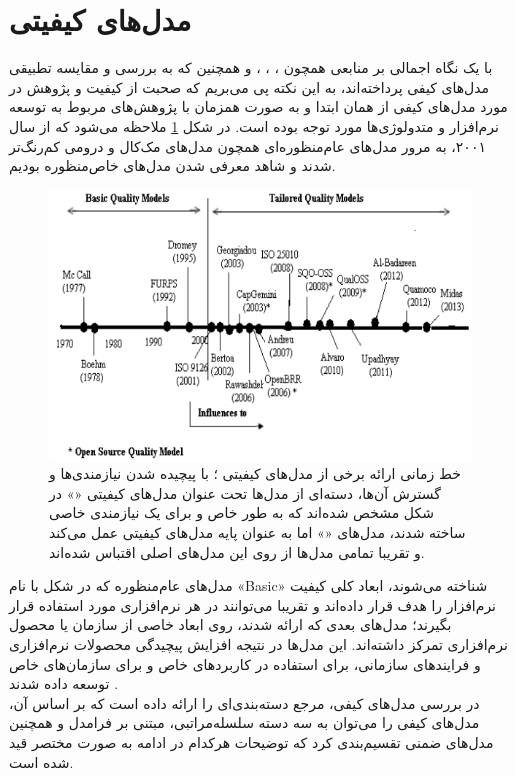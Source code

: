 \section{مدل‌های کیفیتی}
با یک نگاه اجمالی بر منابعی همچون
\cite{wagner_software_2013}،
\cite{seffah_usability_2006}، 
\cite{pressman_software_2015}،
\cite{p._miguel_review_2014}
و همچنین
\cite{sommerville_software_2016}
که به بررسی و مقایسه تطبیقی مدل‌های کیفی پرداخته‌اند، به این نکته پی می‌بریم که صحبت از کیفیت و پژوهش در مورد مدل‌های کیفی از همان ابتدا و به صورت همزمان با پژوهش‌های مربوط به توسعه نرم‌افزار و متدولوژی‌ها مورد توجه بوده است.
در شکل
\ref{fig:qmodels}
ملاحظه می‌شود که از سال ۲۰۰۱، به مرور مدل‌های عام‌منظوره‌ای همچون مدل‌های مک‌کال
و درومی
کم‌رنگ‌تر شدند و شاهد معرفی شدن مدل‌های خاص‌منظوره بودیم.
\begin{figure}[H]
	\centering\includegraphics[width=12cm]{Resources/qmodels.PNG}
	\caption[خط زمانی ارائه برخی از مدل‌های کیفیتی]
	{خط زمانی
		ارائه برخی از مدل‌های کیفیتی
		\cite{p._miguel_review_2014}؛
		با پیچیده شدن نیازمندی‌ها و گسترش آن‌ها، دسته‌ای از مدل‌ها تحت عنوان مدل‌های کیفیتی
		«»
		در شکل مشخص شده‌اند که به طور خاص و برای یک نیازمندی خاصی ساخته شدند، مدل‌های
		«»
		اما به عنوان پایه مدل‌های کیفیتی عمل می‌کند و تقریبا تمامی مدل‌ها از روی این مدل‌های اصلی اقتباس شده‌اند.
	}
	\label{fig:qmodels}
\end{figure}
مدل‌های عام‌منظوره که در شکل با نام «Basic» شناخته می‌شوند، ابعاد کلی کیفیت نرم‌افزار را هدف قرار داده‌اند و تقریبا می‌توانند در هر نرم‌افزاری مورد استفاده قرار بگیرند؛ مدل‌های بعدی که ارائه شدند، روی ابعاد خاصی از سازمان یا محصول نرم‌افزاری تمرکز داشته‌اند. این مدل‌ها در نتیجه افزایش پیچیدگی محصولات نرم‌افزاری و فرایندهای سازمانی، برای استفاده در کاربردهای خاص و برای سازمان‌های خاص توسعه داده شدند
\cite{p._miguel_review_2014}.\\
در بررسی مدل‌های کیفی، مرجع
\cite{wagner_software_2013}
دسته‌بندی‌ای را ارائه داده است که بر اساس آن، مدل‌های کیفی را می‌توان به سه دسته سلسله‌مراتبی، مبتنی بر فرامدل و همچنین مدل‌های ضمنی تقسیم‌بندی کرد که توضیحات هرکدام در ادامه به صورت مختصر قید شده است.
